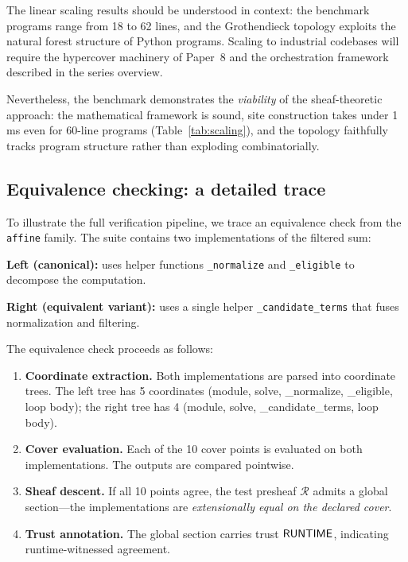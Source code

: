 \documentclass[11pt]{article}
\begin{document}
The linear scaling results should be understood in context: the
benchmark programs range from 18 to 62 lines, and the Grothendieck
topology exploits the natural forest structure of Python programs.
Scaling to industrial codebases will require the hypercover machinery of
Paper~8 and the orchestration framework described in the series overview.

Nevertheless, the benchmark demonstrates the \emph{viability} of the
sheaf-theoretic approach: the mathematical framework is sound, site
construction takes under 1\,ms even for 60-line programs
(Table~\ref{tab:scaling}), and the topology faithfully tracks program
structure rather than exploding combinatorially.

\subsection{Equivalence checking: a detailed trace}

To illustrate the full verification pipeline, we trace an equivalence check
from the \texttt{affine} family.  The suite contains two implementations of
the filtered sum:

\noindent\textbf{Left (canonical):} uses helper functions \texttt{\_normalize}
and \texttt{\_eligible} to decompose the computation.

\noindent\textbf{Right (equivalent variant):} uses a single helper
\texttt{\_candidate\_terms} that fuses normalization and filtering.

The equivalence check proceeds as follows:
\begin{enumerate}[nosep]
  \item \textbf{Coordinate extraction.} Both implementations are parsed into
        coordinate trees.  The left tree has 5 coordinates (module, solve,
        \_normalize, \_eligible, loop body); the right tree has 4 (module,
        solve, \_candidate\_terms, loop body).
  \item \textbf{Cover evaluation.} Each of the 10 cover points is evaluated
        on both implementations.  The outputs are compared pointwise.
  \item \textbf{Sheaf descent.}  If all 10 points agree, the test presheaf
        $\mathcal{R}$ admits a global section---the implementations are
        \emph{extensionally equal on the declared cover}.
  \item \textbf{Trust annotation.}  The global section carries trust
        $\mathsf{RUNTIME}$, indicating runtime-witnessed agreement.
\end{enumerate}
\end{document}

